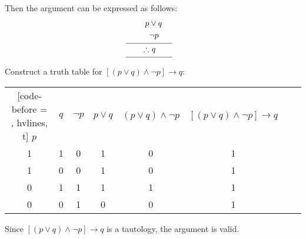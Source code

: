 \documentclass{report}
\begin{document}
\begin{solution}
\begin{enumerate}[label=(\alph*), leftmargin=*]
              Then the argument can be expressed as follows:
              \begin{align*}
                  p          & \lor q                       \\
                             & \neg p                       \\[-8pt]
                             & \mathclap{\rule{2cm}{0.4pt}} \\[-5pt]
                  \therefore & \ q                          \\[-8pt]
                             & \mathclap{\rule{2cm}{0.4pt}}
              \end{align*}
              Construct a truth table for $[(p \lor q) \land \neg p] \rightarrow q$:
              \begin{center}
                  \begin{NiceTabular}{|c|c|c|c|c|c|c|c|}[code-before = , hvlines, t]
                      $p$ & $q$ & $\neg p$ & $p \lor q$ & $(p \lor q) \land \neg p$ & $[(p \lor q) \land \neg p] \rightarrow q$ \\
                      1   & 1   & 0        & 1          & 0                         & 1                                         \\
                      1   & 0   & 0        & 1          & 0                         & 1                                         \\
                      0   & 1   & 1        & 1          & 1                         & 1                                         \\
                      0   & 0   & 1        & 0          & 0                         & 1                                         \\
                  \end{NiceTabular}
              \end{center}
              Since $[(p \lor q) \land \neg p] \rightarrow q$ is a tautology, the argument is valid.
    \end{enumerate}
\end{solution}
\end{document}
